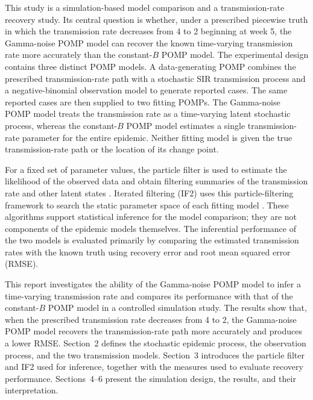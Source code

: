 This study is a simulation-based model comparison and a transmission-rate recovery study. Its central question is whether, under a prescribed piecewise truth in which the transmission rate decreases from 4 to 2 beginning at week 5, the Gamma-noise POMP model can recover the known time-varying transmission rate more accurately than the constant-$B$ POMP model. The experimental design contains three distinct POMP models. A data-generating POMP combines the prescribed transmission-rate path with a stochastic SIR transmission process and a negative-binomial observation model to generate reported cases. The same reported cases are then supplied to two fitting POMPs. The Gamma-noise POMP model treats the transmission rate as a time-varying latent stochastic process, whereas the constant-$B$ POMP model estimates a single transmission-rate parameter for the entire epidemic. Neither fitting model is given the true transmission-rate path or the location of its change point.

For a fixed set of parameter values, the particle filter is used to estimate the likelihood of the observed data and obtain filtering summaries of the transmission rate and other latent states \cite{gordon1993particle,king2016pomp}. Iterated filtering (IF2) uses this particle-filtering framework to search the static parameter space of each fitting model \cite{ionides2015if2}. These algorithms support statistical inference for the model comparison; they are not components of the epidemic models themselves. The inferential performance of the two models is evaluated primarily by comparing the estimated transmission rates with the known truth using recovery error and root mean squared error (RMSE).

This report investigates the ability of the Gamma-noise POMP model to infer a time-varying transmission rate and compares its performance with that of the constant-$B$ POMP model in a controlled simulation study. The results show that, when the prescribed transmission rate decreases from 4 to 2, the Gamma-noise POMP model recovers the transmission-rate path more accurately and produces a lower RMSE. Section~2 defines the stochastic epidemic process, the observation process, and the two transmission models. Section~3 introduces the particle filter and IF2 used for inference, together with the measures used to evaluate recovery performance. Sections~4--6 present the simulation design, the results, and their interpretation.
